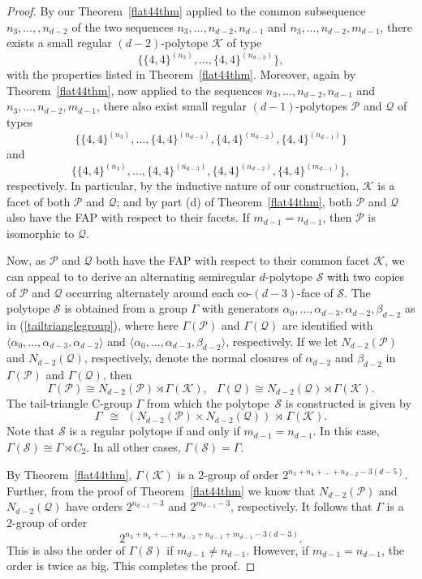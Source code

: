 \documentclass[12pt]{amsart}
\theoremstyle{definition}
\begin{document}
\begin{proof}
By our Theorem~\ref{flat44thm} applied to the common subsequence $n_3,\ldots,,n_{d-2}$ of  the two sequences $n_3,\ldots,n_{d-2},n_{d-1}$ and $n_3,\ldots,n_{d-2},m_{d-1}$, there exists a small regular $(d-2)$-polytope $\mathcal K$ of type  
\[\{\{4,4\}^{(n_3)},\ldots,\{4,4\}^{(n_{d-2})}\},\] 
with the properties listed in Theorem~\ref{flat44thm}. Moreover, again by Theorem~\ref{flat44thm}, now applied to the sequences  $n_3,\ldots,n_{d-2},n_{d-1}$ and $n_3,\ldots,n_{d-2},m_{d-1}$, there also exist small regular $(d-1)$-polytopes $\mathcal P$ and $\mathcal Q$ of types 
\[\{\{4,4\}^{(n_3)},\ldots,\{4,4\}^{(n_{d-3})},\{4,4\}^{(n_{d-2})},\{4,4\}^{(n_{d-1})}\}\]
and 
\[\{\{4,4\}^{(n_3)},\ldots,\{4,4\}^{(n_{d-3})},\{4,4\}^{(n_{d-2})},\{4,4\}^{(m_{d-1})}\},\]
respectively. In particular, by the inductive nature of our construction, $\mathcal{K}$ is a facet of both $\mathcal P$ and $\mathcal Q$; and by part (d) of Theorem~\ref{flat44thm}, both $\mathcal P$ and $\mathcal Q$ also have the FAP with respect to their facets. If $m_{d-1}=n_{d-1}$, then $\mathcal P$ is isomorphic to $\mathcal Q$. 

Now, as $\mathcal P$ and $\mathcal Q$ both have the FAP with respect to their common facet $\mathcal K$, we can appeal to \cite[Thm.~5.3]{MonSch2020} to derive an alternating semiregular $d$-polytope $\mathcal S$ with two copies of $\mathcal P$ and $\mathcal Q$ occurring alternately around each co-$(d-3)$-face of $\mathcal S$. The polytope $\mathcal S$ is obtained from a group $\Gamma$ with generators $\alpha_0,\ldots,\alpha_{d-3},\alpha_{d-2},\beta_{d-2}$ as in (\ref{tailtrianglegroup}), where here $\Gamma(\mathcal{P})$ and $\Gamma(\mathcal{Q})$ are identified with $\langle\alpha_0,\ldots,\alpha_{d-3},\alpha_{d-2}\rangle$ and 
$\langle\alpha_0,\ldots,\alpha_{d-3},\beta_{d-2}\rangle$, respectively. If we let $N_{d-2}(\mathcal{P})$ and $N_{d-2}(\mathcal{Q})$, respectively, denote the normal closures of $\alpha_{d-2}$ and $\beta_{d-2}$ in $\Gamma(\mathcal{P})$ and $\Gamma(\mathcal{Q})$, then 
\[\Gamma(\mathcal{P})\cong N_{d-2}(\mathcal{P})\rtimes \Gamma(\mathcal{K}),\;\;\,
\Gamma(\mathcal{Q})\cong N_{d-2}(\mathcal{Q})\rtimes \Gamma(\mathcal{K}).\]
The tail-triangle C-group $\Gamma$ from which the polytope~$\mathcal S$ is constructed is given by
\[\Gamma\;\,\cong\;\, (N_{d-2}(\mathcal{P}) \times N_{d-2}(\mathcal{Q}))\,\rtimes\,\Gamma(\mathcal{K}).\]
Note that $\mathcal S$ is a regular polytope if and only if $m_{d-1}=n_{d-1}$. In this case, $\Gamma(\mathcal{S})\cong\Gamma\rtimes C_2$. In all other cases, $\Gamma(\mathcal{S})=\Gamma$.

By Theorem~\ref{flat44thm}, $\Gamma(\mathcal{K})$ is a 2-group of order $2^{n_3+n_4+\ldots+n_{d-2} - 3(d-5)}$.  Further, from the proof of Theorem~\ref{flat44thm} we know that $N_{d-2}(\mathcal{P})$ and $N_{d-2}(\mathcal{Q})$ have orders $2^{n_{d-1}-3}$ and 
$2^{m_{d-1}-3}$, respectively. It follows that $\Gamma$ is a 2-group of order 
\[2^{n_3+n_4+\ldots+n_{d-2} +n_{d-1}+m_{d-1}-3(d-3)}.\]
This is also the order of $\Gamma(\mathcal{S})$ if $m_{d-1}\neq n_{d-1}$. However, if $m_{d-1}= n_{d-1}$, the order is twice as big. This completes the proof.
\end{proof}
\end{document}
